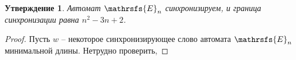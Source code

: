\documentclass[11pt]{article}
\newtheorem{theorem}{Утверждение}
\begin{document}
\begin{theorem}
Автомат $\mathrsfs{E}_n$ синхронизируем, и граница синхронизации равна $n^2 - 3n + 2$.
\end{theorem}
\begin{proof}
Пусть $w$ -- некоторое синхронизирующее слово автомата $\mathrsfs{E}_n$ минимальной длины. Нетрудно проверить, 

\end{proof}
\end{document}
